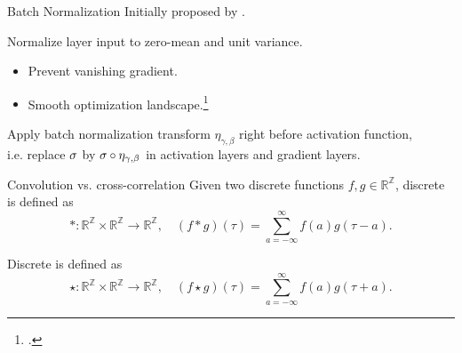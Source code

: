 \begin{frame}[c]{Batch Normalization}
  Initially proposed by \textcite{batchnorm-ioffe15}.

   Normalize layer input to zero-mean and unit variance.

  \begin{itemize}
    \item Prevent vanishing gradient.
    \item Smooth optimization landscape.\footcite{Santurkar2018}
  \end{itemize}

  Apply batch normalization transform $\eta_{\gamma, \beta}$ 
  right before activation function,\\
  i.e. replace $\sigma$ by $\sigma \circ \eta_{\gamma, \beta}$
  in activation layers and gradient layers.
\end{frame}

\begin{frame}[c]{Convolution vs. cross-correlation}
  Given two discrete functions $f,g \in \mathbb{R}^\mathbb{Z}$, discrete
   is defined as 
  \begin{equation*}
    *: \mathbb{R}^{\mathbb{Z}} \times \mathbb{R}^{\mathbb{Z}} \to \mathbb{R}^{\mathbb{Z}},
    \quad (f*g)(\tau) = \sum^{\infty}_{a=-\infty} f(a) g(\tau - a)
    .
  \end{equation*}

  Discrete  is defined as
  \begin{equation*}
    \star: \mathbb{R}^{\mathbb{Z}} \times \mathbb{R}^{\mathbb{Z}} \to \mathbb{R}^{\mathbb{Z}},
    \quad (f \star g)(\tau) = \sum^{\infty}_{a=-\infty} f(a) g(\tau + a)
    .
  \end{equation*}
\end{frame}

